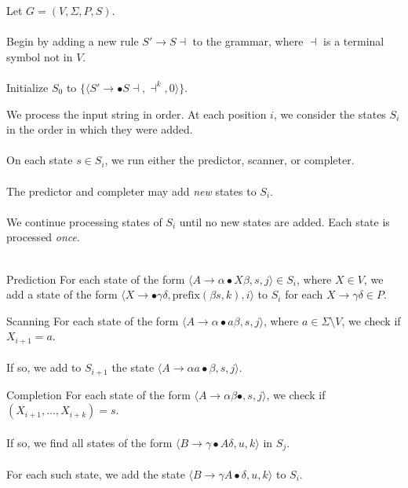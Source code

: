 \documentclass{beamer}
\begin{document}
\begin{frame}
  Let $G = (V, \Sigma, P, S)$. \\~\\

  Begin by adding a new rule $S' \to S \dashv$ to the grammar, where $\dashv$ is a terminal symbol not in $V$. \\~\\

  Initialize $S_0$ to $\{\langle S' \to \bullet S \dashv, \dashv^k, 0 \rangle\}$.
\end{frame}

\begin{frame}
  We process the input string in order. At each position $i$, we consider the states $S_i$ in the order in which they were added.\\~\\

  On each state $s \in S_i$, we run either the predictor, scanner, or completer.\\~\\

  The predictor and completer may add {\it new} states to $S_i$.\\~\\

  We continue processing states of $S_i$ until no new states are added. Each state is processed {\it once}.\\~\\
\end{frame}

\begin{frame}{Prediction}
  For each state of the form $\langle A \to \alpha \bullet X \beta, s, j\rangle \in S_i$, where $X \in V$, we add a state of the form
  $\langle X \to \bullet \gamma\delta, \mbox{prefix}(\beta s, k), i\rangle$ to $S_i$ for each $X \to \gamma\delta \in P$.
\end{frame}

\begin{frame}{Scanning}
  For each state of the form $\langle A \to \alpha \bullet a \beta, s, j\rangle$, where $a \in \Sigma \setminus V$, we check if $X_{i+1} = a$.\\~\\

  If so, we add to $S_{i+1}$ the state $\langle A \to \alpha a \bullet \beta, s, j\rangle$.
\end{frame}

\begin{frame}{Completion}
  For each state of the form $\langle A \to \alpha \beta \bullet, s, j\rangle$, we check if $(X_{i+1}, \ldots, X_{i+k}) = s$.\\~\\

  If so, we find all states of the form $\langle B \to \gamma \bullet A \delta, u, k\rangle$ in $S_j$.\\~\\

  For each such state, we add the state $\langle B \to \gamma A \bullet \delta, u, k\rangle$ to $S_i$.
\end{frame}
\end{document}
